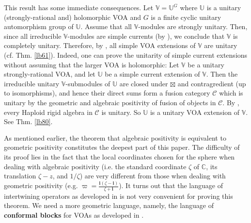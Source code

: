 \documentclass[11pt,b5paper,notitlepage]{article}
\theoremstyle{definition}
\theoremstyle{plain}
\newcommand{\mc}{\mathcal}
\newcommand{\im}{\mathbf{i}}
\newcommand{\Vbb}{\mathbb V}
\newcommand{\Ubb}{\mathbb U}
\newcommand{\Cbb}{\mathbb C}
\numberwithin{equation}{section}
\begin{document}
This result has some immediate consequences. Let $\Vbb=\Ubb^G$ where $\Ubb$ is a unitary (strongly-rational and) holomorphic VOA and $G$ is a finite cyclic unitary automorphism group of $\Ubb$. Assume that all $\Vbb$-modules are strongly unitary. Then, since all irreducible $\Vbb$-modules are simple currents (by \cite{vEMS20}), we conclude that $\Vbb$ is completely unitary. Therefore, by \cite{CGGH23}, all simple VOA extensions of $\Vbb$ are unitary (cf. Thm. \ref{lb61}). Indeed, one can prove the unitarity of simple current extensions without assuming that the larger VOA is holomorphic: Let $\Vbb$ be a unitary strongly-rational VOA, and let $\Ubb$ be a simple current extension of $\Vbb$. Then the irreducible unitary $\Vbb$-submodules of $\Ubb$ are closed under $\boxtimes$ and contragredient (up to isomorphisms), and hence their direct sums form a fusion category $\mc C$ which is unitary by the geometric and algebraic positivity of fusion of objects in $\mc C$. By \cite{CGGH23}, every Haploid rigid algebra in $\mc C$ is unitary. So $\Ubb$ is a unitary VOA extension of $\Vbb$. See Thm. \ref{lb80}.




As mentioned earlier, the theorem that algebraic positivity is equivalent to geometric positivity constitutes the deepest part of this paper. The difficulty of its proof lies in the fact that the local coordinates chosen for the sphere when dealing with algebraic positivity (i.e. the standard coordinate $\zeta$ of $\Cbb$, its translation $\zeta-z$, and $1/\zeta$) are very different from those when dealing with geometric positivity (e.g. $\varpi=\frac{\im(\zeta-\im)}{\zeta+\im}$).   It turns out that the language of intertwining operators as developed in \cite{FHL93} is not very convenient for proving this theorem. We need a more geometric language, namely, the language of \textbf{conformal blocks} for VOAs as developed in \cite{Zhu94,FB04}. 
\end{document}

